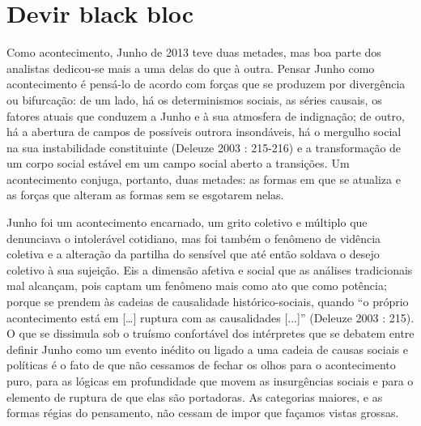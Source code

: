 \chapter{Devir black bloc}


Como acontecimento, Junho de 2013 teve duas metades, mas boa parte dos
analistas dedicou-se mais a uma delas do que à outra. Pensar Junho como
acontecimento é pensá-lo de acordo com forças que se produzem por
divergência ou bifurcação: de um lado, há os determinismos sociais, as
séries causais, os fatores atuais que conduzem a Junho e à sua atmosfera
de indignação; de outro, há a abertura de campos de possíveis outrora
insondáveis, há o mergulho social na sua instabilidade constituinte
(Deleuze 2003 : 215-216) e a transformação de um corpo social estável em
um campo social aberto a transições. Um acontecimento conjuga, portanto,
duas metades: as formas em que se atualiza e as forças que alteram as
formas sem se esgotarem nelas.

Junho foi um acontecimento encarnado, um grito coletivo e múltiplo que
denunciava o intolerável cotidiano, mas foi também o fenômeno de
vidência coletiva e a alteração da partilha do sensível que até então
soldava o desejo coletivo à sua sujeição. Eis a dimensão afetiva e
social que as análises tradicionais mal alcançam, pois captam um
fenômeno mais como ato que como potência; porque se prendem às cadeias
de causalidade histórico-sociais, quando ``o próprio acontecimento está
em {[}\ldots{}{]} ruptura com as causalidades {[}...{]}'' (Deleuze 2003
: 215). O que se dissimula sob o truísmo confortável dos intérpretes que
se debatem entre definir Junho como um evento inédito ou ligado a uma
cadeia de causas sociais e políticas é o fato de que não cessamos de
fechar os olhos para o acontecimento puro, para as lógicas em
profundidade que movem as insurgências sociais e para o elemento de
ruptura de que elas são portadoras. As categorias maiores, e as formas
régias do pensamento, não cessam de impor que façamos vistas grossas.

